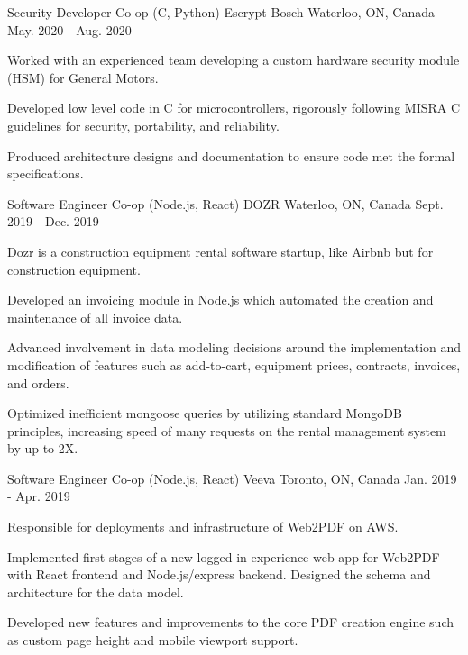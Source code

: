 \begin{cventries}
  \cventry
    {Security Developer Co-op (C, Python)} %
    {Escrypt Bosch} %
    {Waterloo, ON, Canada} %
    {May. 2020 - Aug. 2020} %
    {
      \begin{cvitems} %
\item Worked with an experienced team developing a custom hardware security module (HSM) for General Motors.
\item Developed low level code in C for microcontrollers, rigorously following MISRA C guidelines for security, portability, and reliability.
\item Produced architecture designs and documentation to ensure code met the formal specifications.
      \end{cvitems}
    }

  \cventry
    {Software Engineer Co-op (Node.js, React)} %
    {DOZR} %
    {Waterloo, ON, Canada} %
    {Sept. 2019 - Dec. 2019} %
    {
      \begin{cvitems} %
\item Dozr is a construction equipment rental software startup, like Airbnb but for construction equipment.
\item Developed an invoicing module in Node.js which automated the creation and maintenance of all invoice data.
\item Advanced involvement in data modeling decisions around the implementation and modification of features such as add-to-cart, equipment prices, contracts, invoices, and orders.
\item Optimized inefficient mongoose queries by utilizing standard MongoDB principles, increasing speed of many requests on the rental management system by up to 2X.
      \end{cvitems}
    }

  \cventry
    {Software Engineer Co-op (Node.js, React)} %
    {Veeva} %
    {Toronto, ON, Canada} %
    {Jan. 2019 - Apr. 2019} %
    {
      \begin{cvitems} %
\item Responsible for deployments and infrastructure of Web2PDF on AWS.
\item Implemented first stages of a new logged-in experience web app for Web2PDF with React frontend and Node.js/express backend. Designed the schema and architecture for the data model.
\item Developed new features and improvements to the core PDF creation engine such as custom page height and mobile viewport support.
      \end{cvitems}
    }


\end{cventries}

